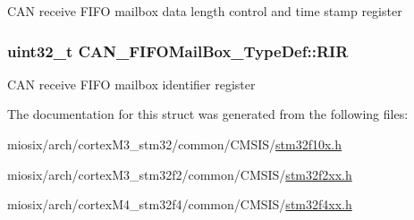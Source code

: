 C\-A\-N receive F\-I\-F\-O mailbox data length control and time stamp register \hypertarget{struct_c_a_n___f_i_f_o_mail_box___type_def_a034504d43f7b16b320745a25b3a8f12d}{
\subsubsection[{R\-I\-R}]{ uint32\-\_\-t C\-A\-N\-\_\-\-F\-I\-F\-O\-Mail\-Box\-\_\-\-Type\-Def\-::\-R\-I\-R}}\label{struct_c_a_n___f_i_f_o_mail_box___type_def_a034504d43f7b16b320745a25b3a8f12d}
C\-A\-N receive F\-I\-F\-O mailbox identifier register 

The documentation for this struct was generated from the following files\-:\begin{DoxyCompactItemize}
\item 
miosix/arch/cortex\-M3\-\_\-stm32/common/\-C\-M\-S\-I\-S/\hyperlink{stm32f10x_8h}{stm32f10x.\-h}\item 
miosix/arch/cortex\-M3\-\_\-stm32f2/common/\-C\-M\-S\-I\-S/\hyperlink{stm32f2xx_8h}{stm32f2xx.\-h}\item 
miosix/arch/cortex\-M4\-\_\-stm32f4/common/\-C\-M\-S\-I\-S/\hyperlink{stm32f4xx_8h}{stm32f4xx.\-h}\end{DoxyCompactItemize}
